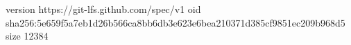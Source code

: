 version https://git-lfs.github.com/spec/v1
oid sha256:5e659f5a7eb1d26b566ca8bb6db3e623e6bea210371d385cf9851ec209b968d5
size 12384
